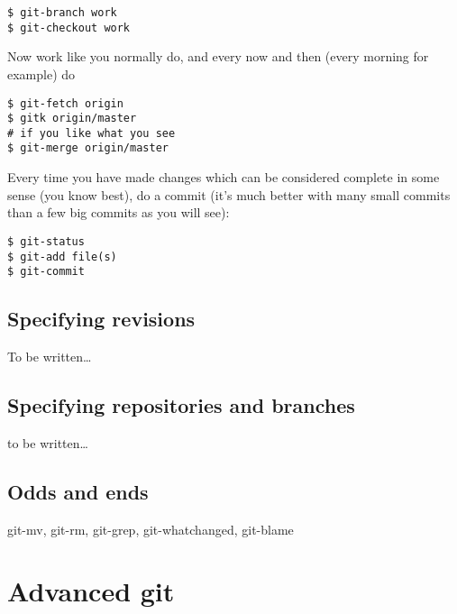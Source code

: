 \documentclass[a4paper,10pt]{article}
\begin{document}
\begin{verbatim}
$ git-branch work
$ git-checkout work 
\end{verbatim}

Now work like you normally do, and every now and then (every morning for
example) do

\begin{verbatim}
$ git-fetch origin
$ gitk origin/master
# if you like what you see
$ git-merge origin/master 
\end{verbatim}

Every time you have made changes which can be considered complete in some
sense (you know best), do a commit (it's much better with many small commits
than a few big commits as you will see):

\begin{verbatim}
$ git-status
$ git-add file(s)
$ git-commit 
\end{verbatim}

\subsection{Specifying revisions}
To be written\ldots

\subsection{Specifying repositories and branches}
to be written\ldots

\subsection{Odds and ends}
git-mv, git-rm, git-grep, git-whatchanged, git-blame


\section{Advanced git}
\end{document}
